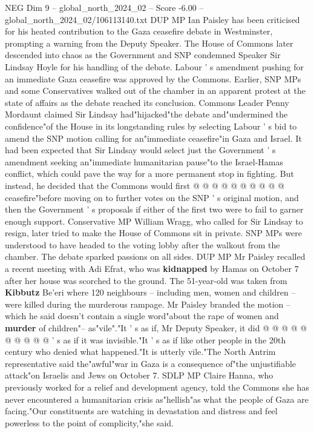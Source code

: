 \begin{textsample}{NEG Dim 9 – global\_north\_2024\_02 – Score -6.00 – global\_north\_2024\_02/106113140.txt}  \label{ex:f9_neg_286}
DUP MP Ian Paisley has been criticised for his heated contribution to the Gaza ceasefire debate in Westminster, prompting a warning from the Deputy Speaker.
The House of Commons later descended into chaos as the Government and SNP condemned Speaker Sir Lindsay Hoyle for his handling of the debate.
Labour ' s amendment pushing for an immediate Gaza ceasefire was approved by the Commons.
Earlier, SNP MPs and some Conservatives walked out of the chamber in an apparent protest at the state of affairs as the debate reached its conclusion.
Commons Leader Penny Mordaunt claimed Sir Lindsay had"hijacked"the debate and"undermined the confidence"of the House in its longstanding rules by selecting Labour ' s bid to amend the SNP motion calling for an"immediate ceasefire"in Gaza and Israel.
It had been expected that Sir Lindsay would select just the Government ' s amendment seeking an"immediate humanitarian pause"to the Israel-Hamas conflict, which could pave the way for a more permanent stop in fighting.
But instead, he decided that the Commons would first @ @ @ @ @ @ @ @ @ @ ceasefire"before moving on to further votes on the SNP ' s original motion, and then the Government ' s proposals if either of the first two were to fail to garner enough support.
Conservative MP William Wragg, who called for Sir Lindsay to resign, later tried to make the House of Commons sit in private.
SNP MPs were understood to have headed to the voting lobby after the walkout from the chamber.
The debate sparked passions on all sides.
DUP MP Mr Paisley recalled a recent meeting with Adi Efrat, who was \textbf{kidnapped} by Hamas on October 7 after her house was scorched to the ground.
The 51-year-old was taken from \textbf{Kibbutz} Be'eri where 120 neighbours -- including men, women and children -- were killed during the murderous rampage.
Mr Paisley branded the motion -- which he said doesn't contain a single word"about the rape of women and \textbf{murder} of children"-- as"vile"."It ' s as if, Mr Deputy Speaker, it did @ @ @ @ @ @ @ @ @ @ ' s as if it was invisible."It ' s as if like other people in the 20th century who denied what happened."It is utterly vile."The North Antrim representative said the"awful"war in Gaza is a consequence of"the unjustifiable attack"on Israelis and Jews on October 7.
SDLP MP Claire Hanna, who previously worked for a relief and development agency, told the Commons she has never encountered a humanitarian crisis as"hellish"as what the people of Gaza are facing."Our constituents are watching in devastation and distress and feel powerless to the point of complicity,"she said.

\end{textsample}

